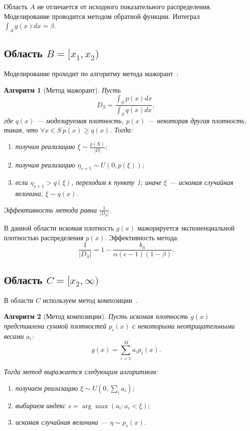 \documentclass[12pt, specialist, subf, substylefile = spbu.rtx]{disser}
\newtheorem{algo}{Алгоритм}
\begin{document}
Область $A$ не отличается от исходного показательного распределения. Моделирование проводится методом обратной функции. Интеграл $\int_A g(x) dx = \beta$.


\subsection{Область $B=[x_1, x_2)$}

Моделирование проходит по алгоритму метода мажорант~\cite{MonErm}:

\begin{algo}[Метод мажорант]\label{algo:mag}
Пусть 
$$
D_S=\frac{\int_S p(x) dx}{\int_S q(x) dx},
$$
где $q(x)$ --- моделируемая плотность, $p(x)$ --- некоторая другая плотность, такая, что $\forall x \in S \ p(x) \ge q(x)$. Тогда:
\begin{enumerate}
\item получим реализацию $\xi \sim \frac{p(X)}{|D|}$;
\item получим реализацию $\eta_{s+1} \sim U(0, p(\xi))$;
\item если $\eta_{s+1} > q(\xi)$, переходим к пункту 1; иначе $\xi$ --- искомая случайная величина, $\xi \sim q(x)$.
\end{enumerate}

Эффективность метода равна $\frac{1}{|D_S|}$.
\end{algo}

В данной области искомая плотность $g(x)$ мажорируется экспоненциальной плотностью распределения $p(x)$. Эффективность метода:
$$
\frac{1}{|D_S|}=1-\frac{b_n}{\alpha(e-1)(1-\beta)}.
$$


\subsection{Область $C=[x_2, \infty)$}

В области $C$ используем метод композиции~\cite{MonErm}. 

\begin{algo}[Метод композиции]\label{alg:comp}
Пусть искомая плотность $g(x)$ представлена суммой плотностей $p_i(x)$ с некоторыми неотрицательными весами $a_i$:
\begin{equation}\label{eq:comp_common}
g(x)=\sum\limits_{i=1}^M a_ip_i(x).
\end{equation}

Тогда метод выражается следующим алгоритмом:
\begin{enumerate}
\item получаем реализацию $\xi \sim U(0, \sum_i a_i)$;
\item выбираем индекс $s=\arg\max(a_i:a_i<\xi);$
\item искомая случайная величина --- $\eta \sim p_s(x)$.
\end{enumerate}
\end{algo}
\end{document}
